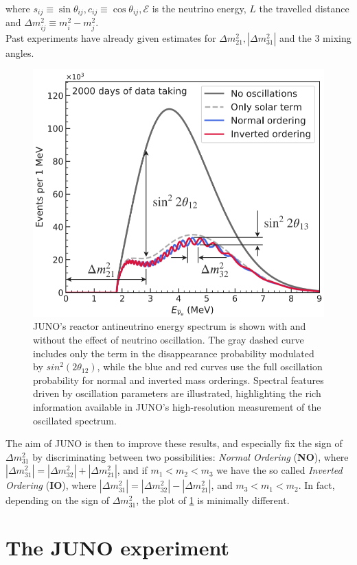 where $s_{i j} \equiv \sin \theta_{i j}, c_{i j} \equiv \cos \theta_{i j}, \mathcal{E}$ is the neutrino energy, $L$ the travelled distance and $\Delta m_{i j}^2 \equiv m_i^2-m_j^2$. \\
Past experiments have already given estimates for  $\Delta m_{21}^2,\left|\Delta m_{31}^2\right|$ and the  3 mixing angles. 


\begin{figure}[h]
	\centering
	\includegraphics[width=0.4\linewidth]{Images/antineutino_to_antineutrino_probability_plot}
	\caption{JUNO's reactor antineutrino energy spectrum is shown with and without the effect of neutrino oscillation. The gray dashed curve includes only the term in the disappearance probability modulated by $sin^2(2\theta_{12})$, while the blue and red curves use the full oscillation probability for normal and inverted mass orderings. Spectral features driven by oscillation parameters are illustrated, highlighting the rich information available in JUNO's high-resolution measurement of the oscillated spectrum.}
	\label{fig:antineutinotoantineutrinoprobabilityplot}
\end{figure}


The aim of JUNO is then to improve these results, and especially fix the sign of $\Delta m_{31}^2$ by discriminating between two possibilities:\textit{ Normal Ordering} (\textbf{NO}), where $\left|\Delta m_{31}^2\right|=\left|\Delta m_{32}^2\right|+\left|\Delta m_{21}^2\right|$, and if $m_1<m_2<m_3$ we have the so called \textit{ Inverted Ordering} (\textbf{IO}), where $\left|\Delta m_{31}^2\right|=\left|\Delta m_{32}^2\right|-\left|\Delta m_{21}^2\right|$, and $m_3<m_1<m_2$.
In fact, depending on the sign of $\Delta m_{31}^2$, the plot of \ref{fig:antineutinotoantineutrinoprobabilityplot} is minimally different.


\section{The JUNO experiment}

